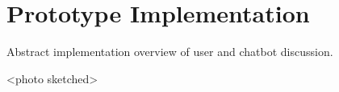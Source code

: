 

\section{Prototype Implementation}

Abstract implementation overview of user and chatbot discussion.

<photo sketched>




